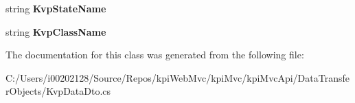 \begin{DoxyCompactItemize}
\item 
\mbox{\label{classkpi_mvc_api_1_1_data_transfer_objects_1_1_kvp_data_dto_a51355ea3d90f7f8df5296dabf8a53fef}} 
string {\bfseries Kvp\+State\+Name}
\item 
\mbox{\label{classkpi_mvc_api_1_1_data_transfer_objects_1_1_kvp_data_dto_af58459f2fe09d39cb1caf862456a944f}} 
string {\bfseries Kvp\+Class\+Name}
\end{DoxyCompactItemize}


The documentation for this class was generated from the following file\+:\begin{DoxyCompactItemize}
\item 
C\+:/\+Users/i00202128/\+Source/\+Repos/kpi\+Web\+Mvc/kpi\+Mvc/kpi\+Mvc\+Api/\+Data\+Transfer\+Objects/Kvp\+Data\+Dto.\+cs\end{DoxyCompactItemize}
